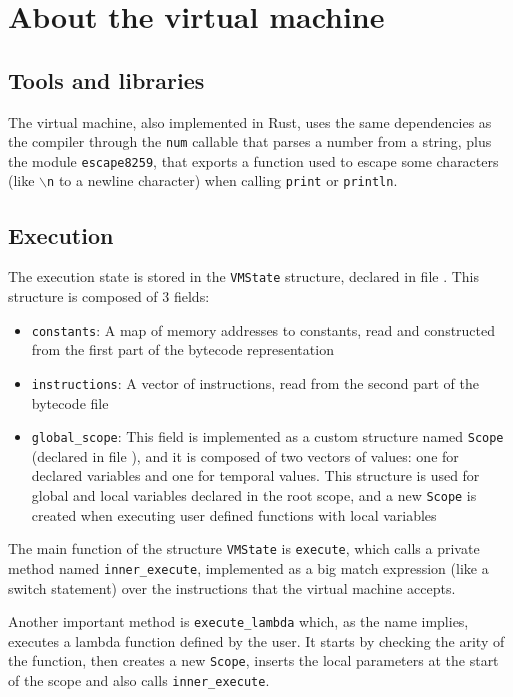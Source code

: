 \documentclass[11pt]{scrreprt}
\begin{document}
\chapter{About the virtual machine}

\section{Tools and libraries}
The virtual machine, also implemented in Rust, uses the same dependencies as the compiler through the \texttt{num} callable that parses a number from a string, plus the module \texttt{escape8259}, that exports a function used to escape some characters (like \texttt{$\backslash$n} to a newline character) when calling \texttt{print} or \texttt{println}.

\section{Execution}
The execution state is stored in the \texttt{VMState} structure, declared in file . This structure is composed of 3 fields:
\begin{itemize}
  \item \texttt{constants}: A map of memory addresses to constants, read and constructed from the first part of the bytecode representation
  \item \texttt{instructions}: A vector of instructions, read from the second part of the bytecode file
  \item \texttt{global\_scope}: This field is implemented as a custom structure named \texttt{Scope} (declared in file ), and it is composed of two vectors of values: one for declared variables and one for temporal values. This structure is used for global and local variables declared in the root scope, and a new \texttt{Scope} is created when executing user defined functions with local variables
\end{itemize}

The main function of the structure \texttt{VMState} is \texttt{execute}, which calls a private method named \texttt{inner\_execute}, implemented as a big match expression (like a switch statement) over the instructions that the virtual machine accepts.

Another important method is \texttt{execute\_lambda} which, as the name implies, executes a lambda function defined by the user. It starts by checking the arity of the function, then creates a new \texttt{Scope}, inserts the local parameters at the start of the scope and also calls \texttt{inner\_execute}.
\end{document}
